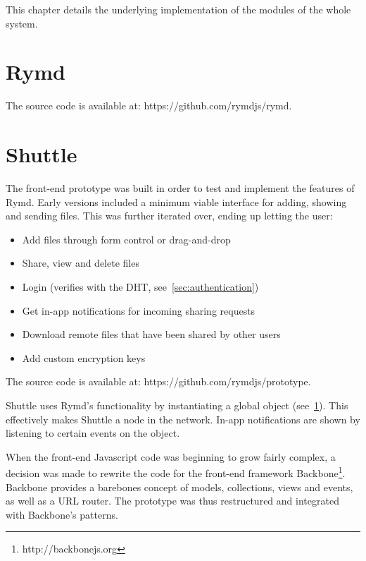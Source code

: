 
This chapter details the underlying implementation of the modules of the whole system.

\section{Rymd}
\label{sec:rymd}


The source code is available at: https://github.com/rymdjs/rymd.

\section{Shuttle}
\label{sec:shuttle}
The front-end prototype was built in order to test and implement the features of Rymd. Early versions included a minimum viable interface for adding, showing and sending files. This was further iterated over, ending up letting the user:

\begin{itemize}
  \item Add files through form control or drag-and-drop
  \item Share, view and delete files
  \item Login (verifies with the DHT, see~\ref{sec:authentication})
  \item Get in-app notifications for incoming sharing requests
  \item Download remote files that have been shared by other users
  \item Add custom encryption keys
\end{itemize}

The source code is available at: https://github.com/rymdjs/prototype.

Shuttle uses Rymd's functionality by instantiating a global  object (see~\ref{sec:rymd}). This effectively makes Shuttle a node in the network. In-app notifications are shown by listening to certain events on the  object.

When the front-end Javascript code was beginning to grow fairly complex, a decision was made to rewrite the code for the front-end framework Backbone\footnote{http://backbonejs.org}. Backbone provides a barebones concept of models, collections, views and events, as well as a URL router. The prototype was thus restructured and integrated with Backbone's patterns.

